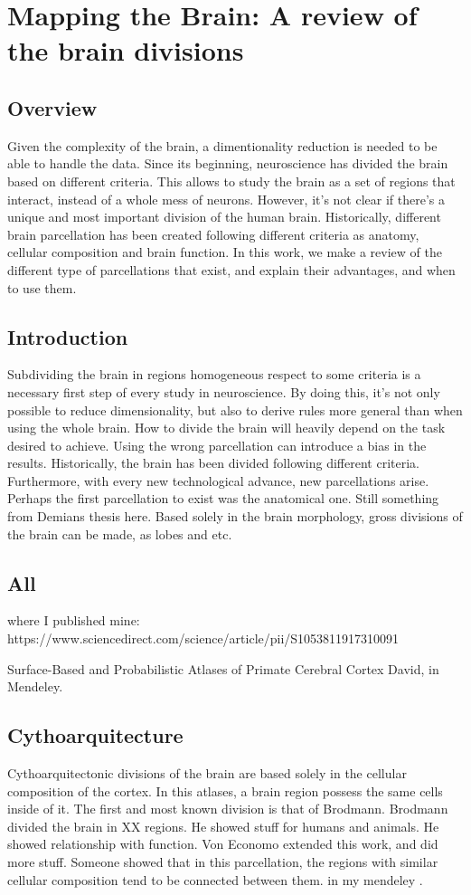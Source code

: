 \chapter{Mapping the Brain: A review of the brain divisions}

\section{Overview}
Given the complexity of the brain, a dimentionality reduction is needed to
be able to handle the data. Since its beginning, neuroscience has divided
the brain based on different criteria. This allows to study the brain as a
set of regions that interact, instead of a whole mess of neurons. However,
it's not clear if there's a unique and most important division of the human
brain. Historically, different brain parcellation has been created following
different criteria as anatomy, cellular composition and brain function. In
this work, we make a review of the different type of parcellations that
exist, and explain their advantages, and when to use them.

\section{Introduction}
Subdividing the brain in regions homogeneous respect to some criteria is a
necessary first step of every study in neuroscience. By doing this, it's not
only possible to reduce dimensionality, but also to derive rules more general
than when using the whole brain. How to divide the brain will heavily depend
on the task desired to achieve. Using the wrong parcellation can introduce
a bias in the results. Historically, the brain has been divided following
different criteria. Furthermore, with every new technological advance, new
parcellations arise. Perhaps the first parcellation to exist was the anatomical
one. Still something from Demians thesis here. Based solely in the brain
morphology, gross divisions of the brain can be made, as lobes and etc.



\section{All}
where I published mine:
https://www.sciencedirect.com/science/article/pii/S1053811917310091

Surface-Based and Probabilistic Atlases of Primate Cerebral Cortex
David, in Mendeley.

\section{Cythoarquitecture}
Cythoarquitectonic divisions of the brain are based solely in the cellular
composition of the cortex. In this atlases, a brain region possess the same
cells inside of it. The first and most known division is that of Brodmann.
Brodmann divided the brain in XX regions. He showed stuff for humans and
animals. He showed relationship with function.
Von Economo extended this work, and did more stuff. Someone showed that 
in this parcellation, the regions with similar cellular composition tend
to be connected between them.
in my mendeley \cite{Glover2011}.

